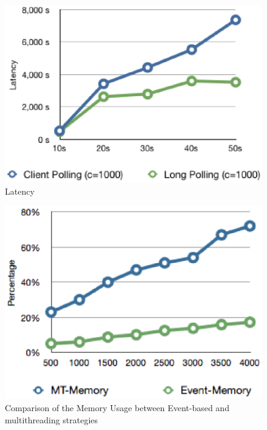 \begin{figure}[htb!]
\centering%
    \includegraphics[scale=0.60]{figures/latency.eps}
    \caption{Latency}
    \label{fig:traffic_latency}
\end{figure}

\begin{figure}[htb!]
\centering%
    \includegraphics[scale=0.60]{figures/memory.eps}
    \caption{Comparison of the Memory Usage between Event-based and multithreading strategies}
    \label{fig:memory}
\end{figure}

